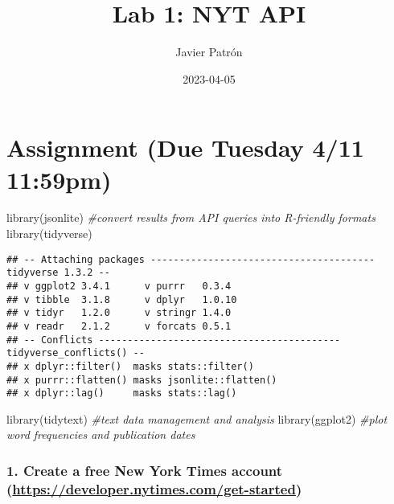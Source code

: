 \documentclass[
]{article}
\title{Lab 1: NYT API}
\author{Javier Patrón}
\date{2023-04-05}
\newenvironment{Shaded}{\begin{snugshade}}{\end{snugshade}}
\newcommand{\CommentTok}[1]{\textcolor[rgb]{0.56,0.35,0.01}{\textit{#1}}}
\newcommand{\FunctionTok}[1]{\textcolor[rgb]{0.00,0.00,0.00}{#1}}
\newcommand{\NormalTok}[1]{#1}
\begin{document}
\maketitle

\hypertarget{assignment-due-tuesday-411-1159pm}{%
\section{Assignment (Due Tuesday 4/11
11:59pm)}\label{assignment-due-tuesday-411-1159pm}}

\begin{Shaded}
\begin{Highlighting}[]
\FunctionTok{library}\NormalTok{(jsonlite) }\CommentTok{\#convert results from API queries into R{-}friendly formats }
\FunctionTok{library}\NormalTok{(tidyverse)}
\end{Highlighting}
\end{Shaded}

\begin{verbatim}
## -- Attaching packages --------------------------------------- tidyverse 1.3.2 --
## v ggplot2 3.4.1      v purrr   0.3.4 
## v tibble  3.1.8      v dplyr   1.0.10
## v tidyr   1.2.0      v stringr 1.4.0 
## v readr   2.1.2      v forcats 0.5.1 
## -- Conflicts ------------------------------------------ tidyverse_conflicts() --
## x dplyr::filter()  masks stats::filter()
## x purrr::flatten() masks jsonlite::flatten()
## x dplyr::lag()     masks stats::lag()
\end{verbatim}

\begin{Shaded}
\begin{Highlighting}[]
\FunctionTok{library}\NormalTok{(tidytext) }\CommentTok{\#text data management and analysis}
\FunctionTok{library}\NormalTok{(ggplot2) }\CommentTok{\#plot word frequencies and publication dates\textasciigrave{}\textasciigrave{}\textasciigrave{}}
\end{Highlighting}
\end{Shaded}

\hypertarget{create-a-free-new-york-times-account-httpsdeveloper.nytimes.comget-started}{%
\subsubsection{\texorpdfstring{1. Create a free New York Times account
(\url{https://developer.nytimes.com/get-started})}{1. Create a free New York Times account (https://developer.nytimes.com/get-started)}}\label{create-a-free-new-york-times-account-httpsdeveloper.nytimes.comget-started}}
\end{document}
